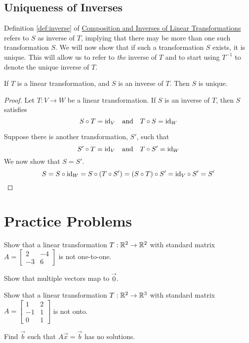 \documentclass{ximera}
\begin{document}
\subsection*{Uniqueness of Inverses}

Definition \ref{def:inverse} of \href{https://ximera.osu.edu/oerlinalg/LinearAlgebra/LTR-0030/main}{Composition and Inverses of Linear Transformations} refers to $S$ as  inverse of $T$, implying that there may be more than one such transformation $S$.  We will now show that if such a transformation $S$ exists, it is unique.  This will allow us to refer to {\it the} inverse of $T$ and to start using $T^{-1}$ to denote the unique inverse of $T$.

\begin{theorem}\label{th:inverseisunique}
If $T$ is a linear transformation, and $S$ is an inverse of $T$.  Then $S$ is unique.
\end{theorem}
\begin{proof}
Let $T:V\rightarrow W$ be a linear transformation.  If $S$ is an inverse of $T$, then $S$ satisfies
$$S\circ T=\text{id}_V\quad \text{and}\quad T\circ S=\text{id}_W$$

Suppose there is another transformation, $S'$, such that 
$$S'\circ T=\text{id}_V\quad \text{and}\quad T\circ S'=\text{id}_W$$
We now show that $S=S'$.
$$S=S\circ \text{id}_W=S\circ(T\circ S')=(S\circ T)\circ S'=\text{id}_V\circ S'=S'$$
\end{proof}

\section*{Practice Problems}
\begin{problem}
Show that a linear transformation $T:\mathbb{R}^2\rightarrow \mathbb{R}^2$ with standard matrix $A=\begin{bmatrix}2&-4\\-3&6\end{bmatrix}$ is not one-to-one.
\begin{hint}
        Show that multiple vectors map to $\vec{0}$.
      \end{hint}
\end{problem}
 
 \begin{problem}
 Show that a linear transformation $T:\mathbb{R}^2\rightarrow \mathbb{R}^3$ with standard matrix $A=\begin{bmatrix}1&2\\-1&1\\0&1\end{bmatrix}$ is not onto.
 \begin{hint}
 Find $\vec{b}$ such that $A\vec{x}=\vec{b}$ has no solutions.
 \end{hint}
 \end{problem}
 
\end{document}
